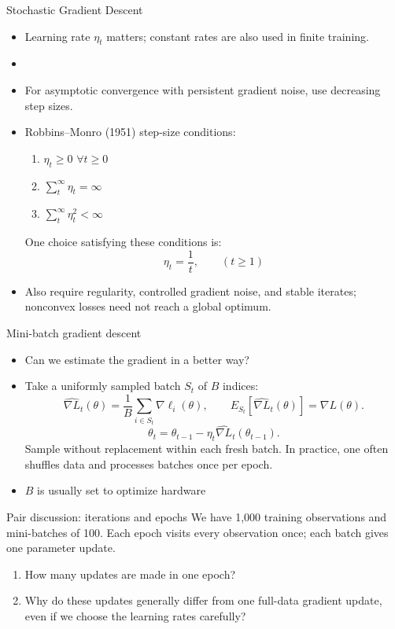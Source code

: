 \documentclass[10pt]{beamer}
\begin{document}
\begin{frame}{Stochastic Gradient Descent}


\begin{itemize}
\item Learning rate $\eta_t$ matters; constant rates are also used in finite training.
\item {}\pause
\item For asymptotic convergence with persistent gradient noise, use decreasing step sizes.\pause
\item Robbins--Monro (1951) step-size conditions:
\begin{enumerate}
\item $\eta_t \geq 0$ $\forall t \geq 0$
\item $\sum^\infty_t \eta_t = \infty$
\item $\sum^\infty_t \eta_t^2 < \infty$
\end{enumerate}
\pause
\vspace{4mm}
One choice satisfying these conditions is:
\[
\eta_t = \frac{1}{t}, \qquad (t \ge 1)
\]
\item Also require regularity, controlled gradient noise, and stable iterates; nonconvex losses need not reach a global optimum.
\end{itemize}

\end{frame}


\begin{frame}{Mini-batch gradient descent}

\begin{itemize}
\item Can we estimate the gradient in a better way?\pause
\item Take a uniformly sampled batch $S_t$ of $B$ indices:
\[
\widehat{\nabla L}_t(\theta)=\frac{1}{B}\sum_{i\in S_t}\nabla\ell_i(\theta),
\qquad E_{S_t}[\widehat{\nabla L}_t(\theta)]=\nabla L(\theta).
\]
\[
\theta_t = \theta_{t-1} - \eta_t\widehat{\nabla L}_t(\theta_{t-1}).
\]
Sample without replacement within each fresh batch. In practice, one often shuffles data and processes batches once per epoch.
\pause
\item $B$ is usually set to optimize hardware
\end{itemize}

\end{frame}

\begin{frame}{Pair discussion: iterations and epochs}
We have 1,000 training observations and mini-batches of 100. Each epoch visits every observation once; each batch gives one parameter update.

\begin{enumerate}
\item How many updates are made in one epoch?
\item Why do these updates generally differ from one full-data gradient update, even if we choose the learning rates carefully?
\end{enumerate}
\end{frame}
\end{document}

